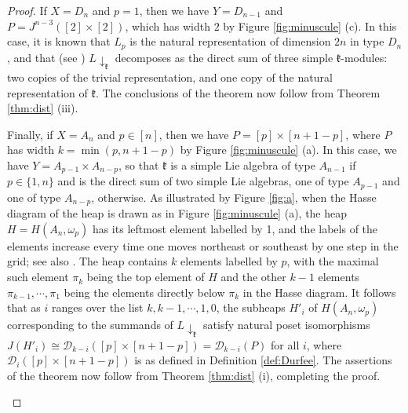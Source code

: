 \documentclass[11pt]{amsart}
\theoremstyle{plain}
\theoremstyle{definition}
\theoremstyle{remark}
\numberwithin{equation}{section}
\newcommand{\fk}{{\mathfrak k}}
\newcommand{\cald}{\mathcal{D}}
\newcommand{\res}{L\!\downarrow_\fk}
\begin{document}
\begin{proof}
If $X=D_n$ and $p=1$, then we have $Y=D_{n-1}$ and $P=J^{n-3}([2]\times[2])$,
which has width $2$ by Figure \ref{fig:minuscule} (c). In
this case, it is known that $L_p$ is the natural representation of dimension
$2n$ in type $D_n$, and  that (see \cite[Exercise 8.2.16 (iii)]{green13}) $\res$
decomposes as the direct sum of three simple $\fk$-modules: two copies of the
trivial representation, and one copy of the natural representation of $\fk$. The
conclusions of the theorem now follow from Theorem \ref{thm:dist} (iii).

Finally, if $X=A_n$ and $p\in [n]$, then we have $P=[p]\times[n+1-p]$, where $P$
has width $k=\min(p,n+1-p)$ by Figure \ref{fig:minuscule} (a). In this case, we
have $Y=A_{p-1}\times A_{n-p}$, so that $\fk$ is a simple Lie algebra of type
$A_{n-1}$ if $p\in \{1,n\}$ and is the direct sum of two simple Lie algebras, one
of type $A_{p-1}$ and one of type $A_{n-p}$, otherwise.  As illustrated by
Figure \ref{fig:a},  when the Hasse diagram of the heap is drawn as in Figure
\ref{fig:minuscule} (a), the heap $H=H(A_n,\omega_p)$ has its leftmost element
labelled by 1, and the labels of the elements increase every time one moves
northeast or southeast by one step in the grid; see also \cite[Section
6.2]{green13}. The heap contains $k$ elements labelled by $p$, with the maximal
such element $\pi_k$ being the top element of $H$ and  the other
$k-1$ elements $\pi_{k-1},\cdots,\pi_1$ being the elements directly below
$\pi_k$ in the Hasse diagram.  It follows that as $i$ ranges over
the list
$k,k-1,\cdots,1,0$, the subheaps $H'_i$ of $H(A_n,\omega_p)$ corresponding to
the summands of $\res$ satisfy natural poset isomorphisms $ J(H'_i)\cong
\cald_{k-i}([p]\times[n+1-p])=\cald_{k-i}(P)$ for all $i$, where
$\cald_i([p]\times[n+1-p])$ is as
defined in Definition \ref{def:Durfee}. The assertions of the theorem now follow
from Theorem \ref{thm:dist} (i), completing the proof.
\begin{figure}[h!] \centering
\end{figure}
\end{proof}
\end{document}

